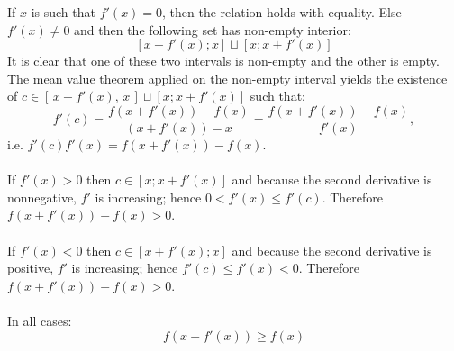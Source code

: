 \begin{solution}
    If \( x \) is such that \( f'\left(x\right) = 0 \), then the relation holds with equality. Else \( f'\left(x\right)\neq 0 \) and then the following set has non-empty interior:
    \[
        \left[x + f'\left(x\right);x\right]\sqcup\left[x;x+ f'\left(x\right)\right]
    \]
    It is clear that one of these two intervals is non-empty and the other is empty. The mean value theorem applied on the non-empty interval yields the existence of \( c\in \left[\,x + f'\left(x\right),\, x\,\right]\sqcup\left[x;x+ f'\left(x\right)\right] \) such that:
    \[
        f'\left(c\right) = \frac{f\left(x + f'\left(x\right)\right) - f\left(x\right)}{\left(x + f'\left(x\right)\right) - x} = \frac{f\left(x + f'\left(x\right)\right) - f\left(x\right)}{f'\left(x\right)},
    \]
    i.e. \( f'\left(c\right)f'\left(x\right)=f\left(x + f'\left(x\right)\right) - f\left(x\right) \).
    \\\\
    If \( f'\left(x\right)>0 \) then \( c\in \left[x;x+ f'\left(x\right)\right] \) and because the second derivative is nonnegative, \( f' \) is increasing; hence \( 0< f'\left(x\right) \leq f'\left(c\right) \). Therefore \( f\left(x + f'\left(x\right)\right) - f\left(x\right)>0 \).
    \\\\
    If \( f'\left(x\right)<0 \) then \( c\in \left[x+ f'\left(x\right);x\right] \) and because the second derivative is positive, \( f' \) is increasing; hence \( f'\left(c\right) \leq f'\left(x\right)<0 \). Therefore \( f\left(x + f'\left(x\right)\right) - f\left(x\right)>0 \).
    \\\\
    In all cases:
    \[
        f\left(x + f'\left(x\right)\right) \geq f\left(x\right)
    \]
\end{solution}
